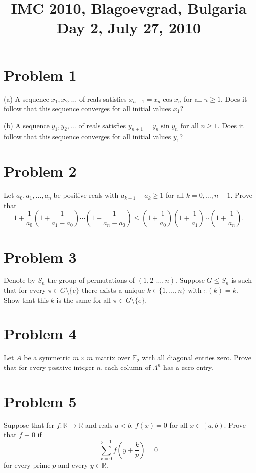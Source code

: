 \documentclass{article}
\title{IMC 2010, Blagoevgrad, Bulgaria \\ Day 2, July 27, 2010}
\date{}
\begin{document}
\maketitle

\section*{Problem 1}
(a) A sequence $x_1, x_2, \ldots$ of reals satisfies $x_{n+1} = x_n \cos x_n$ for all $n \ge 1$. Does it follow that this sequence converges for all initial values $x_1$?

(b) A sequence $y_1, y_2, \ldots$ of reals satisfies $y_{n+1} = y_n \sin y_n$ for all $n \ge 1$. Does it follow that this sequence converges for all initial values $y_1$?

\section*{Problem 2}
Let $a_0, a_1, \ldots, a_n$ be positive reals with $a_{k+1} - a_k \ge 1$ for all $k = 0, \ldots, n-1$. Prove that
\[
1 + \frac{1}{a_0}\left(1 + \frac{1}{a_1 - a_0}\right)\cdots\left(1 + \frac{1}{a_n - a_0}\right) \le \left(1 + \frac{1}{a_0}\right)\left(1 + \frac{1}{a_1}\right)\cdots\left(1 + \frac{1}{a_n}\right).
\]

\section*{Problem 3}
Denote by $S_n$ the group of permutations of $(1, 2, \ldots, n)$. Suppose $G \le S_n$ is such that for every $\pi \in G \setminus \{e\}$ there exists a unique $k \in \{1, \ldots, n\}$ with $\pi(k) = k$. Show that this $k$ is the same for all $\pi \in G \setminus \{e\}$.

\section*{Problem 4}
Let $A$ be a symmetric $m \times m$ matrix over $\mathbb{F}_2$ with all diagonal entries zero. Prove that for every positive integer $n$, each column of $A^n$ has a zero entry.

\section*{Problem 5}
Suppose that for $f : \mathbb{R} \to \mathbb{R}$ and reals $a < b$, $f(x) = 0$ for all $x \in (a, b)$. Prove that $f \equiv 0$ if
\[
\sum_{k=0}^{p-1} f\!\left(y + \frac{k}{p}\right) = 0
\]
for every prime $p$ and every $y \in \mathbb{R}$.
\end{document}
